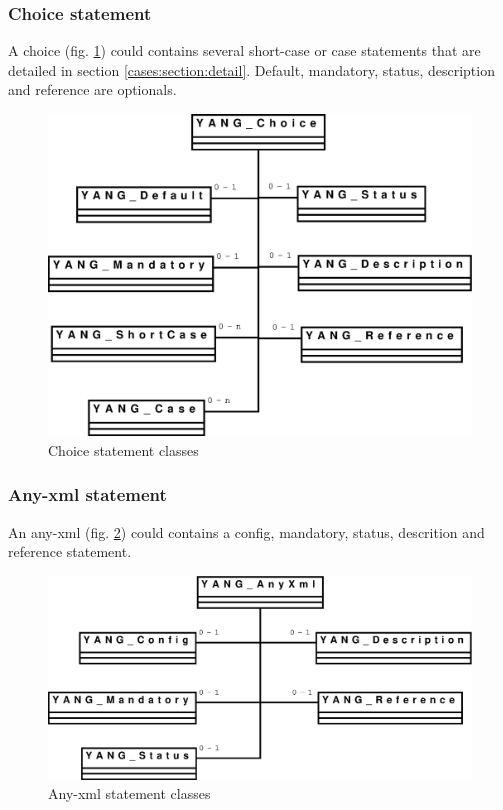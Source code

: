 \documentclass[a4paper]{article}
\begin{document}
\subsubsection{Choice statement}
\label{cases:section:global}
A choice (fig. \ref{choice}) could contains several short-case or case
statements       that        are       detailed       in       section
\ref{cases:section:detail}.  Default,  mandatory, status,  description
and reference are optionals.
\begin{figure}[htbp]
\begin{center}
\includegraphics[scale = .3]{choice.eps}
\end{center}
\caption{Choice statement classes}
\label{choice}
\end{figure}

\subsubsection{Any-xml statement}

An  any-xml (fig.  \ref{anyxml}) could  contains a  config, mandatory,
status, descrition and reference statement.
\begin{figure}[htbp]
\begin{center}
\includegraphics[scale = .3]{anyxml.eps}
\end{center}
\caption{Any-xml statement classes}
\label{anyxml}
\end{figure}
\end{document}
